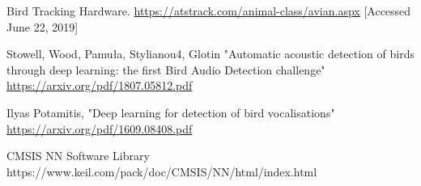 \documentclass[12pt,journal,compsoc]{IEEEtran}
\begin{document}
\begin{thebibliography}{1}

Bird Tracking Hardware.
\url{https://atstrack.com/animal-class/avian.aspx} [Accessed June 22, 2019]

Stowell, Wood, Pamuła, Stylianou4, Glotin "Automatic acoustic detection of birds through deep learning: the first Bird Audio Detection challenge"
\url{https://arxiv.org/pdf/1807.05812.pdf}

Ilyas Potamitis, "Deep learning for detection of bird vocalisations"
\url{https://arxiv.org/pdf/1609.08408.pdf}

CMSIS NN Software Library
https://www.keil.com/pack/doc/CMSIS/NN/html/index.html

\end{thebibliography}
\end{document}
